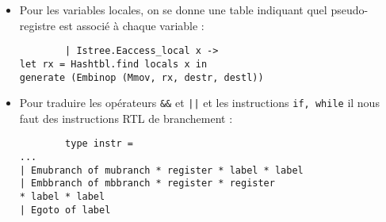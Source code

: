\documentclass{cours}
\begin{document}
\begin{itemize}
    \item Pour les variables locales, on se donne une table indiquant quel pseudo-registre est associé à chaque variable :
          \begin{verbatim}
        | Istree.Eaccess_local x ->
let rx = Hashtbl.find locals x in
generate (Embinop (Mmov, rx, destr, destl))
    \end{verbatim}
    \item Pour traduire les opérateurs \texttt{\&\&} et \texttt{||} et les instructions \texttt{if, while} il nous faut des instructions RTL de branchement :
          \begin{verbatim}
        type instr =
...
| Emubranch of mubranch * register * label * label
| Embbranch of mbbranch * register * register
* label * label
| Egoto of label


\end{verbatim}
\end{itemize}
\end{document}
